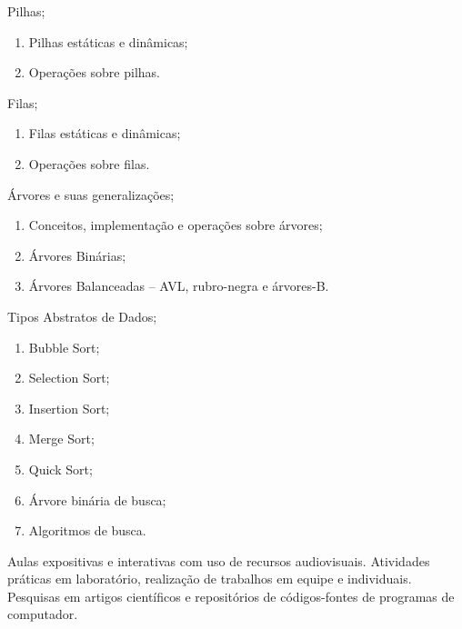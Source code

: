 \begin{pud}
\begin{description}[itemsep=0em]
         \item[UNIDADE III:] Pilhas; 
         \begin{enumerate}[itemsep=0em, topsep=0em]
           \item Pilhas estáticas e dinâmicas;
           \item Operações sobre pilhas.
         \end{enumerate}
         
         \item[UNIDADE IV:] Filas; 
         \begin{enumerate}[itemsep=0em, topsep=0em]
           \item Filas estáticas e dinâmicas;
           \item Operações sobre filas.
         \end{enumerate}
         
         \item[UNIDADE V:] Árvores e suas generalizações; 
         \begin{enumerate}[itemsep=0em, topsep=0em]
           \item Conceitos, implementação e operações sobre árvores;
           \item Árvores Binárias;
           \item Árvores Balanceadas -- AVL, rubro-negra e árvores-B.
         \end{enumerate}
         
         \item[UNIDADE VI:] Tipos Abstratos de Dados; 
         \begin{enumerate}[itemsep=0em, topsep=0em]
           \item Bubble Sort;
           \item Selection Sort;
           \item Insertion Sort;
           \item Merge Sort;
           \item Quick Sort;
           \item Árvore binária de busca;
           \item Algoritmos de busca.
         \end{enumerate}
	\end{description}
	
	\metodologia
	Aulas expositivas e interativas com uso de recursos audiovisuais. Atividades
práticas em laboratório, realização de trabalhos em equipe e individuais. Pesquisas
em artigos científicos e repositórios de códigos-fontes de programas de computador.


\end{pud}
